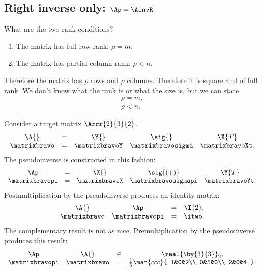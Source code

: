 \subsection{Right inverse only: $\Ap=\AinvR$}
What are the two rank conditions?
\begin{enumerate}
\item The matrix has full row rank: $\rho = m$.
\item The matrix has partial column rank: $\rho < n$.
\end{enumerate}
Therefore the matrix has $\rho$ rows and $\rho$ columns. Therefore it is square and of full rank. We don't know what the rank is or what the size is, but we can state
\begin{equation}
  \begin{split}
     \rho = m,\\
     \rho < n.
  \end{split}
\end{equation}

Consider a target matrix $\Arrr{2}{3}{2}$.
\begin{equation*}
  \begin{array}{ccccc}
  \A{} &=& \Y{} & \sig{} & \X{T}\\
  \matrixbravo &=
  & \matrixbravoY  
  & \matrixbravosigma
  & \matrixbravoXt.
  \end{array}
\end{equation*}
The pseudoinverse is constructed in this fashion:
\begin{equation*}
  \begin{array}{ccccc}
    \Ap &=& \X{} & \sig{(+)} & \Y{T} \\
    \matrixbravopi &=
    & \matrixbravoX 
    & \matrixbravosigmapi
    & \matrixbravoYt.
  \end{array}
\end{equation*}
Postmultiplication by the pseudoinverse produces an identity matrix:
\begin{equation*}
  \begin{array}{cccc}
    \A{}&\Ap&=&\I{2},\\
   \matrixbravo &
   \matrixbravopi &=&
   \itwo.
  \end{array}
\end{equation*}
The complementary result is not as nice. Premultiplication by the pseudoinverse produces this result:
\begin{equation*}
  \begin{array}{cccc}
    \Ap&\A{}&\in&\real{\by{3}{3}}_{2},\\
   \matrixbravopi &
   \matrixbravo &=&
   \frac{1}{5}
   \mat{ccc}
   {
   1&0&2\\
   0&5&0\\
   2&0&4
   }.
  \end{array}
\end{equation*}

